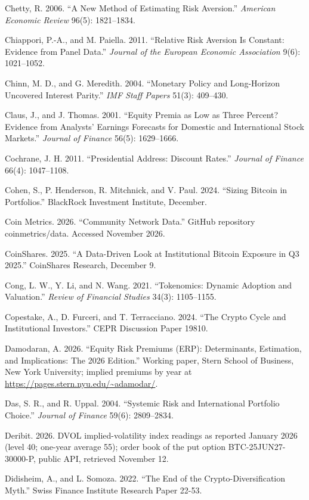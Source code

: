 \documentclass[11pt]{article}
\begin{document}
\begin{list}{}{\setlength{\itemindent}{-1.5em}\setlength{\leftmargin}{1.5em}\setlength{\itemsep}{2pt}\setlength{\parsep}{0pt}}
\item Chetty, R. 2006. ``A New Method of Estimating Risk Aversion.'' \emph{American Economic Review} 96(5): 1821--1834.
\item Chiappori, P.-A., and M. Paiella. 2011. ``Relative Risk Aversion Is Constant: Evidence from Panel Data.'' \emph{Journal of the European Economic Association} 9(6): 1021--1052.
\item Chinn, M. D., and G. Meredith. 2004. ``Monetary Policy and Long-Horizon Uncovered Interest Parity.'' \emph{IMF Staff Papers} 51(3): 409--430.
\item Claus, J., and J. Thomas. 2001. ``Equity Premia as Low as Three Percent? Evidence from Analysts' Earnings Forecasts for Domestic and International Stock Markets.'' \emph{Journal of Finance} 56(5): 1629--1666.
\item Cochrane, J. H. 2011. ``Presidential Address: Discount Rates.'' \emph{Journal of Finance} 66(4): 1047--1108.
\item Cohen, S., P. Henderson, R. Mitchnick, and V. Paul. 2024. ``Sizing Bitcoin in Portfolios.'' BlackRock Investment Institute, December.
\item Coin Metrics. 2026. ``Community Network Data.'' GitHub repository coinmetrics/data. Accessed November 2026.
\item CoinShares. 2025. ``A Data-Driven Look at Institutional Bitcoin Exposure in Q3 2025.'' CoinShares Research, December 9.
\item Cong, L. W., Y. Li, and N. Wang. 2021. ``Tokenomics: Dynamic Adoption and Valuation.'' \emph{Review of Financial Studies} 34(3): 1105--1155.
\item Copestake, A., D. Furceri, and T. Terracciano. 2024. ``The Crypto Cycle and Institutional Investors.'' CEPR Discussion Paper 19810.
\item Damodaran, A. 2026. ``Equity Risk Premiums (ERP): Determinants, Estimation, and Implications: The 2026 Edition.'' Working paper, Stern School of Business, New York University; implied premiums by year at \url{https://pages.stern.nyu.edu/~adamodar/}.
\item Das, S. R., and R. Uppal. 2004. ``Systemic Risk and International Portfolio Choice.'' \emph{Journal of Finance} 59(6): 2809--2834.
\item Deribit. 2026. DVOL implied-volatility index readings as reported January 2026 (level 40; one-year average 55); order book of the put option BTC-25JUN27-30000-P, public API, retrieved November 12.
\item Didisheim, A., and L. Somoza. 2022. ``The End of the Crypto-Diversification Myth.'' Swiss Finance Institute Research Paper 22-53.

\end{list}
\end{document}

